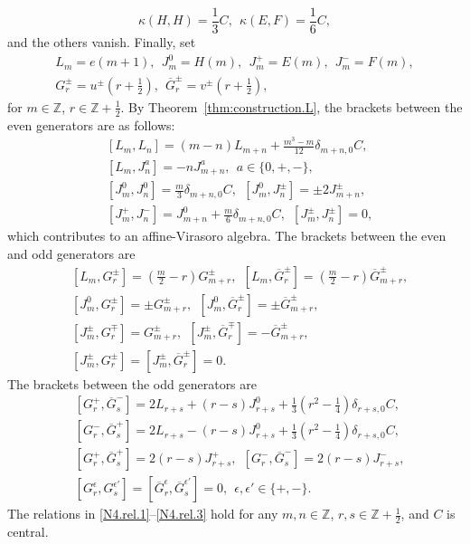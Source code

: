 \documentclass[12pt]{article}
\numberwithin{equation}{section}
\theoremstyle{definition}
\theoremstyle{plain}
\newcommand{\bZ}{\ensuremath{\mathbb{Z}}}
\begin{document}
\begin{equation*}
    \kappa(H,H)=\frac{1}{3}C,\ \ \kappa(E,F)=\frac{1}{6}C,
\end{equation*}
and the others vanish. Finally, set
\begin{gather*}
    L_m=e(m+1),\ \ J_m^0=H(m),\ \ J_m^+=E(m),\ \ J_m^-=F(m),\\
    G_r^\pm=u^\pm(r+\frac{1}{2}),\ \ \overline{G}_r^\pm=v^\pm(r+\frac{1}{2}),
\end{gather*}
for $m\in\bZ$, $r\in\bZ+\frac{1}{2}$. By Theorem~\ref{thm:construction.L}, the brackets between the even generators are as follows:
\begin{equation}\label{N4.rel.1}
    \begin{split}
        &[L_m,L_n]=(m-n)L_{m+n}+\frac{m^3-m}{12}\delta_{m+n,0}C,\\
    &[L_m,J^a_n]=-nJ^a_{m+n},\ \ a\in\{0,+,-\},\\
    &[J^0_m,J^0_n]=\frac{m}{3}\delta_{m+n,0}C,\ \ [J^0_m,J^\pm_n]=\pm2J^\pm_{m+n},\\
    &[J^+_m,J^-_n]=J^0_{m+n}+\frac{m}{6}\delta_{m+n,0}C,\ \ [J^\pm_m,J^\pm_n]=0,
    \end{split}
\end{equation}
which contributes to an affine-Virasoro algebra. The brackets between the even and odd generators are
\begin{equation}\label{N4.rel.2}
    \begin{split}
        &[L_m,G^\pm_r]=(\frac m2-r)G^\pm_{m+r},\ \ [L_m,\overline G^\pm_r]=(\frac m2-r)\overline G^\pm_{m+r},\\
    &[J^0_m,G^\pm_r]=\pm G^\pm_{m+r},\ \ [J^0_m,\overline G^\pm_r]=\pm\overline G^\pm_{m+r},\\
    &[J^\pm_m,G^\mp_r]=G^\pm_{m+r},\ \ [J^\pm_m,\overline G^\mp_r]=-\overline G^\pm_{m+r},\\
    &[J^\pm_m,G^\pm_r]=[J^\pm_m,\overline G^\pm_r]=0.
    \end{split}
\end{equation}
The brackets between the odd generators are
\begin{equation}\label{N4.rel.3}
    \begin{split}
        &[G^+_r,\overline G^-_s]=2L_{r+s}+(r-s)J^0_{r+s}+\frac13\left(r^2-\frac14\right)\delta_{r+s,0}C,\\
    &[G^-_r,\overline G^+_s]=2L_{r+s}-(r-s)J^0_{r+s}+\frac13\left(r^2-\frac14\right)\delta_{r+s,0}C,\\
    &[G^+_r,\overline G^+_s]=2(r-s)J^+_{r+s},\ \ [G^-_r,\overline G^-_s]=2(r-s)J^-_{r+s},\\
    &[G^\epsilon_r,G^{\epsilon'}_s]=[\overline G^\epsilon_r,\overline G^{\epsilon'}_s]=0,
      \ \ \epsilon,\epsilon'\in\{+,-\}.
    \end{split}
\end{equation}
The relations in \eqref{N4.rel.1}--\eqref{N4.rel.3} hold for any $m,n\in\mathbb Z$, $r,s\in\bZ+\frac12$, and $C$ is central.
\end{document}
